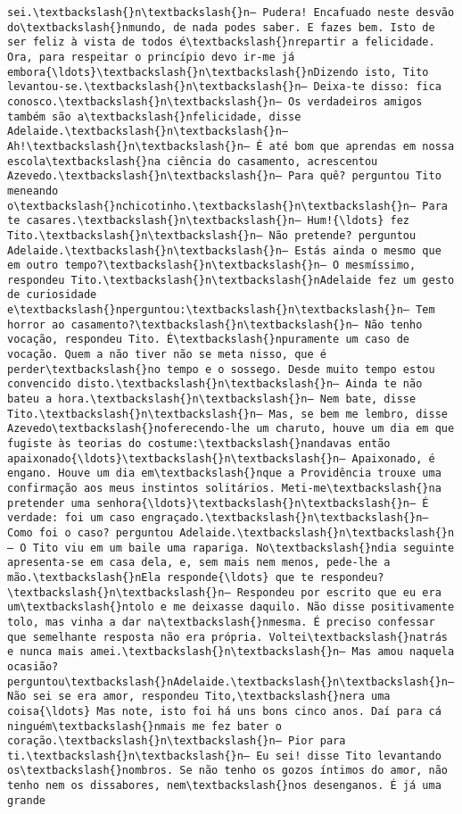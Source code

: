 \begin{Verbatim}[commandchars=\\\{\}]
sei.\textbackslash{}n\textbackslash{}n— Pudera! Encafuado neste desvão do\textbackslash{}nmundo, de nada podes saber. E fazes bem. Isto de ser feliz à vista de todos é\textbackslash{}nrepartir a felicidade. Ora, para respeitar o princípio devo ir-me já embora{\ldots}\textbackslash{}n\textbackslash{}nDizendo isto, Tito levantou-se.\textbackslash{}n\textbackslash{}n— Deixa-te disso: fica conosco.\textbackslash{}n\textbackslash{}n— Os verdadeiros amigos também são a\textbackslash{}nfelicidade, disse Adelaide.\textbackslash{}n\textbackslash{}n— Ah!\textbackslash{}n\textbackslash{}n— É até bom que aprendas em nossa escola\textbackslash{}na ciência do casamento, acrescentou Azevedo.\textbackslash{}n\textbackslash{}n— Para quê? perguntou Tito meneando o\textbackslash{}nchicotinho.\textbackslash{}n\textbackslash{}n— Para te casares.\textbackslash{}n\textbackslash{}n— Hum!{\ldots} fez Tito.\textbackslash{}n\textbackslash{}n— Não pretende? perguntou Adelaide.\textbackslash{}n\textbackslash{}n— Estás ainda o mesmo que em outro tempo?\textbackslash{}n\textbackslash{}n— O mesmíssimo, respondeu Tito.\textbackslash{}n\textbackslash{}nAdelaide fez um gesto de curiosidade e\textbackslash{}nperguntou:\textbackslash{}n\textbackslash{}n— Tem horror ao casamento?\textbackslash{}n\textbackslash{}n— Não tenho vocação, respondeu Tito. É\textbackslash{}npuramente um caso de vocação. Quem a não tiver não se meta nisso, que é perder\textbackslash{}no tempo e o sossego. Desde muito tempo estou convencido disto.\textbackslash{}n\textbackslash{}n— Ainda te não bateu a hora.\textbackslash{}n\textbackslash{}n— Nem bate, disse Tito.\textbackslash{}n\textbackslash{}n— Mas, se bem me lembro, disse Azevedo\textbackslash{}noferecendo-lhe um charuto, houve um dia em que fugiste às teorias do costume:\textbackslash{}nandavas então apaixonado{\ldots}\textbackslash{}n\textbackslash{}n— Apaixonado, é engano. Houve um dia em\textbackslash{}nque a Providência trouxe uma confirmação aos meus instintos solitários. Meti-me\textbackslash{}na pretender uma senhora{\ldots}\textbackslash{}n\textbackslash{}n— É verdade: foi um caso engraçado.\textbackslash{}n\textbackslash{}n— Como foi o caso? perguntou Adelaide.\textbackslash{}n\textbackslash{}n— O Tito viu em um baile uma rapariga. No\textbackslash{}ndia seguinte apresenta-se em casa dela, e, sem mais nem menos, pede-lhe a mão.\textbackslash{}nEla responde{\ldots} que te respondeu?\textbackslash{}n\textbackslash{}n— Respondeu por escrito que eu era um\textbackslash{}ntolo e me deixasse daquilo. Não disse positivamente tolo, mas vinha a dar na\textbackslash{}nmesma. É preciso confessar que semelhante resposta não era própria. Voltei\textbackslash{}natrás e nunca mais amei.\textbackslash{}n\textbackslash{}n— Mas amou naquela ocasião? perguntou\textbackslash{}nAdelaide.\textbackslash{}n\textbackslash{}n— Não sei se era amor, respondeu Tito,\textbackslash{}nera uma coisa{\ldots} Mas note, isto foi há uns bons cinco anos. Daí para cá ninguém\textbackslash{}nmais me fez bater o coração.\textbackslash{}n\textbackslash{}n— Pior para ti.\textbackslash{}n\textbackslash{}n— Eu sei! disse Tito levantando os\textbackslash{}nombros. Se não tenho os gozos íntimos do amor, não tenho nem os dissabores, nem\textbackslash{}nos desenganos. É já uma grande 
\end{Verbatim}
